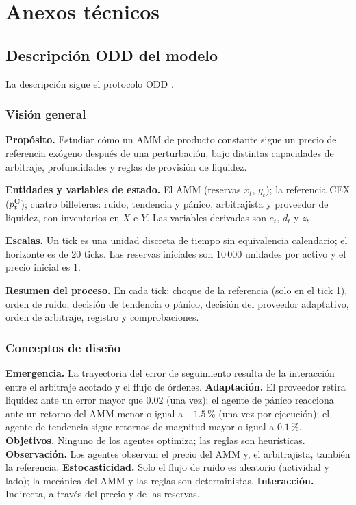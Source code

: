 \chapter{Anexos técnicos}
\label{cap:anexos}

\section{Descripción ODD del modelo}
\label{sec:odd}

La descripción sigue el protocolo ODD \cite{grimm2020odd}.

\subsection*{Visión general}

\textbf{Propósito.} Estudiar cómo un AMM de producto constante sigue un precio de referencia exógeno después de una perturbación, bajo distintas capacidades de arbitraje, profundidades y reglas de provisión de liquidez.

\textbf{Entidades y variables de estado.} El AMM (reservas $x_t$, $y_t$); la referencia CEX ($p^{\mathrm{C}}_t$); cuatro billeteras: ruido, tendencia y pánico, arbitrajista y proveedor de liquidez, con inventarios en $X$ e $Y$. Las variables derivadas son $e_t$, $d_t$ y $z_t$.

\textbf{Escalas.} Un tick es una unidad discreta de tiempo sin equivalencia calendario; el horizonte es de 20 ticks. Las reservas iniciales son $10\,000$ unidades por activo y el precio inicial es 1.

\textbf{Resumen del proceso.} En cada tick: choque de la referencia (solo en el tick 1), orden de ruido, decisión de tendencia o pánico, decisión del proveedor adaptativo, orden de arbitraje, registro y comprobaciones.

\subsection*{Conceptos de diseño}

\textbf{Emergencia.} La trayectoria del error de seguimiento resulta de la interacción entre el arbitraje acotado y el flujo de órdenes. \textbf{Adaptación.} El proveedor retira liquidez ante un error mayor que $0.02$ (una vez); el agente de pánico reacciona ante un retorno del AMM menor o igual a $-1.5\,\%$ (una vez por ejecución); el agente de tendencia sigue retornos de magnitud mayor o igual a $0.1\,\%$. \textbf{Objetivos.} Ninguno de los agentes optimiza; las reglas son heurísticas. \textbf{Observación.} Los agentes observan el precio del AMM y, el arbitrajista, también la referencia. \textbf{Estocasticidad.} Solo el flujo de ruido es aleatorio (actividad y lado); la mecánica del AMM y las reglas son deterministas. \textbf{Interacción.} Indirecta, a través del precio y de las reservas.

